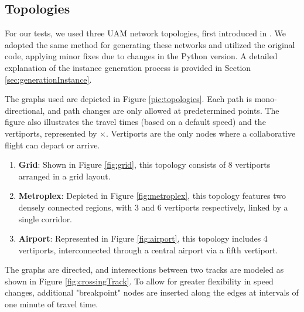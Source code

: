 \documentclass[../../thesis.tex]{subfiles}
\begin{document}
\subsection{Topologies}\label{sec:topologies}
For our tests, we used three UAM network topologies, first introduced in \cite{pelegrin-2023}.  
We adopted the same method for generating these networks and utilized the 
original code, 
applying minor fixes due to changes in the Python version.
A detailed explanation of the instance generation process is provided in Section \ref{sec:generationInstance}.  

The graphs used are depicted in Figure \ref{pic:topologies}. Each path is mono-directional, and path changes are only allowed at predetermined points.  
The figure also illustrates the travel times (based on a default speed) and the vertiports, represented by $\times$.  
Vertiports are the only nodes where a collaborative flight can depart or arrive.  

\begin{enumerate}
    \item \textbf{Grid}: Shown in Figure \ref{fig:grid}, this topology consists of 8 vertiports arranged in a grid layout.
    \item \textbf{Metroplex}: Depicted in Figure \ref{fig:metroplex}, this topology features two densely connected regions, with 3 and 6 vertiports respectively, linked by a single corridor.
    \item \textbf{Airport}: Represented in Figure \ref{fig:airport}, this topology includes 4 vertiports, interconnected through a central airport via a fifth vertiport.
\end{enumerate}

The graphs are directed, and intersections between two tracks are modeled as shown in Figure \ref{fig:crossingTrack}.  
To allow for greater flexibility in speed changes, additional "breakpoint" nodes are inserted along the edges at intervals of one minute of travel time.
\end{document}
